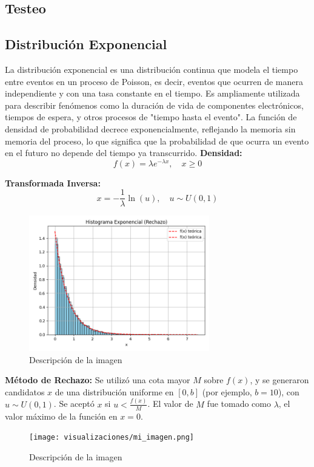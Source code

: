 \documentclass{article}
\begin{document}
\subsection{Testeo}

\subsection{Distribución Exponencial}
La distribución exponencial es una distribución continua que modela el tiempo entre eventos en un proceso de Poisson, es decir, eventos que ocurren de manera independiente y con una tasa constante en el tiempo. Es ampliamente utilizada para describir fenómenos como la duración de vida de componentes electrónicos, tiempos de espera, y otros procesos de "tiempo hasta el evento". La función de densidad de probabilidad decrece exponencialmente, reflejando la memoria sin memoria del proceso, lo que significa que la probabilidad de que ocurra un evento en el futuro no depende del tiempo ya transcurrido.
\textbf{Densidad:}
\begin{equation}
f(x) = \lambda e^{-\lambda x}, \quad x \geq 0
\end{equation}

\textbf{Transformada Inversa:}
\begin{equation}
x = -\frac{1}{\lambda} \ln(u), \quad u \sim U(0,1)
\end{equation}
\begin{figure}[H] %
    \centering
    \includegraphics[width=0.7\textwidth]{visualizaciones/exponencial_Rechazo.png}
    \caption{Descripción de la imagen}
    \label{fig:mi_imagen}
\end{figure}


\textbf{Método de Rechazo:} Se utilizó una cota mayor $M$ sobre $f(x)$, y se generaron candidatos $x$ de una distribución uniforme en $[0, b]$ (por ejemplo, $b = 10$), con $u \sim U(0,1)$. Se aceptó $x$ si $u < \frac{f(x)}{M}$. El valor de $M$ fue tomado como $\lambda$, el valor máximo de la función en $x=0$.
\begin{figure}[H] %
    \centering
    \texttt{[image: visualizaciones/mi\_imagen.png]}
    \caption{Descripción de la imagen}
    \label{fig:mi_imagen}
\end{figure}
\end{document}
